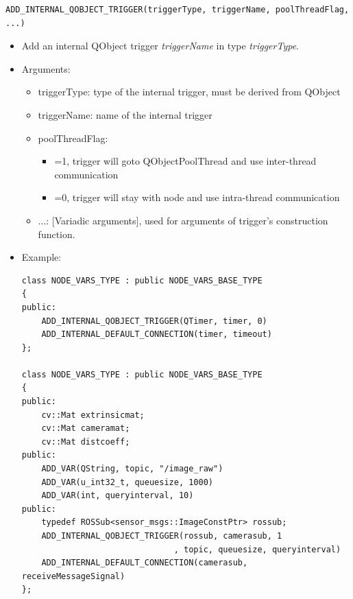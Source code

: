 \documentclass[a4paper,10pt]{book}
\begin{document}
\begin{mdframed}
\begin{verbatim}
ADD_INTERNAL_QOBJECT_TRIGGER(triggerType, triggerName, poolThreadFlag, ...)
\end{verbatim}
\begin{itemize}
 \item Add an internal QObject trigger {\em{triggerName}} in type {\em{triggerType}}.
 \item Arguments:
 \begin{itemize}
  \item triggerType: type of the internal trigger, must be derived from QObject
  \item triggerName: name of the internal trigger
  \item poolThreadFlag:
  \begin{itemize}
   \item =1, trigger will goto QObjectPoolThread and use inter-thread communication
   \item =0, trigger will stay with node and use intra-thread communication
  \end{itemize}
 
  \item ...: [Variadic arguments], used for arguments of trigger's construction function. 
 \end{itemize}
 \item Example:
 \begin{verbatim}
class NODE_VARS_TYPE : public NODE_VARS_BASE_TYPE
{
public:
    ADD_INTERNAL_QOBJECT_TRIGGER(QTimer, timer, 0)
    ADD_INTERNAL_DEFAULT_CONNECTION(timer, timeout)
};
 
class NODE_VARS_TYPE : public NODE_VARS_BASE_TYPE
{
public:
    cv::Mat extrinsicmat;
    cv::Mat cameramat;
    cv::Mat distcoeff;
public:
    ADD_VAR(QString, topic, "/image_raw")
    ADD_VAR(u_int32_t, queuesize, 1000)
    ADD_VAR(int, queryinterval, 10)
public:
    typedef ROSSub<sensor_msgs::ImageConstPtr> rossub;
    ADD_INTERNAL_QOBJECT_TRIGGER(rossub, camerasub, 1
                               , topic, queuesize, queryinterval)
    ADD_INTERNAL_DEFAULT_CONNECTION(camerasub, receiveMessageSignal)
};
 \end{verbatim}
\end{itemize}
\end{mdframed}
\end{document}
